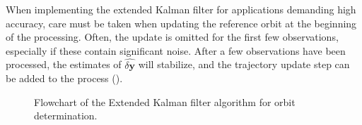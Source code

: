 When implementing the extended Kalman filter for applications demanding high accuracy, 
care must be taken when updating the reference orbit at the beginning of the
processing. Often, the update is omitted for the first few observations, especially 
if these contain significant noise. After a few observations have been processed, 
the estimates of $\hat{\delta \bm{y}}$ will stabilize, and the trajectory update step 
can be added to the process (\cite{Tapley2004}).

\begin{figure}
    \centering
    
    \caption{Flowchart of the Extended Kalman filter algorithm for orbit determination.}
    \label{fig:efk-pod}
\end{figure}

